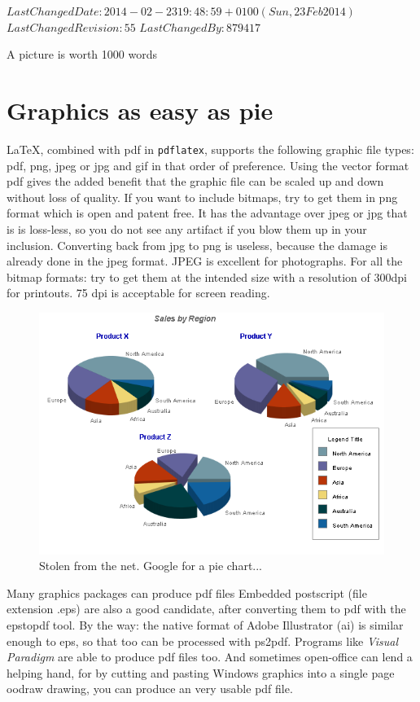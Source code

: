 %
{$LastChangedDate: 2014-02-23 19:48:59 +0100 (Sun, 23 Feb 2014) $}%
{$LastChangedRevision: 55 $}%
{$LastChangedBy: 879417 $}
\renewcommand\TheFile{graphics.tex}
\begin{savequote}[6cm]
  \sffamily
A picture is worth 1000 words
\end{savequote}
\chapter{Graphics as easy as pie}
\LaTeX, combined with pdf in \texttt{pdflatex}, supports the following
graphic file types: pdf, png, jpeg or jpg and gif in that order of
preference. Using the vector format pdf gives the added benefit that
the graphic file can be scaled up and down without loss of quality.
If you want to include bitmaps, try to get them in png format which
is open and patent free. It has the advantage over jpeg or jpg that is is
loss-less, so you do not see any artifact if you blow them up in your
inclusion. Converting back from jpg to png is useless, because the
damage is already done in the jpeg format. JPEG is excellent for
photographs. For all the bitmap formats: try to get them at the
intended size with a resolution of 300dpi for printouts. 75 dpi is
acceptable for screen reading.
  
\begin{figure}[thbp]
  \centering
  \includegraphics[width=.8\textwidth]{figures/servlet3.png}
  \caption[A Pie chart]{Stolen from the net. Google for a pie chart...}
  \label{fig:pie}
\end{figure}

Many graphics packages can produce pdf files
Embedded postscript (file extension .eps) are also a good candidate,
after converting them to pdf with the epstopdf tool. By the way: the
native format of Adobe Illustrator (ai) is similar enough to eps, so
that too can be processed with ps2pdf. Programs like {\em Visual
  Paradigm} are able to produce pdf files too. And sometimes open-office can
lend a helping hand, for by cutting and pasting Windows graphics into
a single page oodraw drawing, you can produce an very usable pdf file. 

